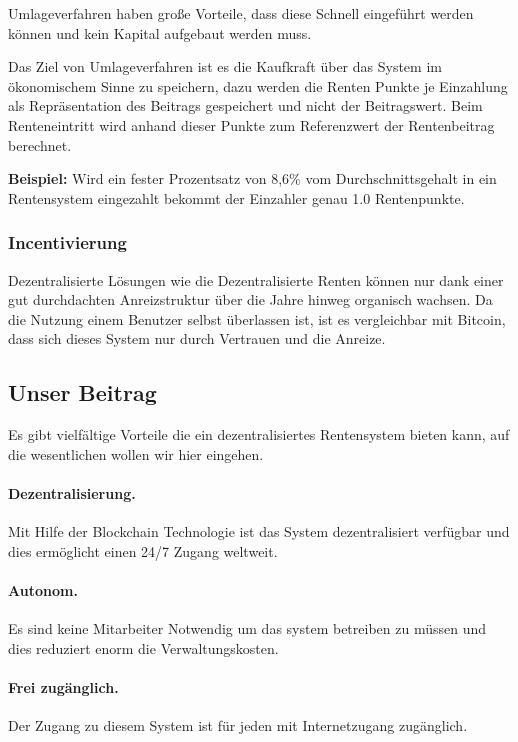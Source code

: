 Umlageverfahren haben große Vorteile, dass diese Schnell eingeführt werden können und kein Kapital aufgebaut werden muss.

Das Ziel von Umlageverfahren ist es die Kaufkraft über das System im ökonomischem Sinne zu speichern, dazu werden die Renten Punkte je Einzahlung als Repräsentation des Beitrags gespeichert und nicht der Beitragswert.
Beim Renteneintritt wird anhand dieser Punkte zum Referenzwert der Rentenbeitrag berechnet. 

\textbf{Beispiel:} Wird ein fester Prozentsatz von 8,6\% vom Durchschnittsgehalt in ein Rentensystem eingezahlt bekommt der Einzahler genau 1.0 Rentenpunkte.


\subsubsection{Incentivierung}


Dezentralisierte Lösungen wie die Dezentralisierte Renten können nur dank einer gut durchdachten Anreizstruktur über die Jahre hinweg organisch wachsen. Da die Nutzung einem Benutzer selbst überlassen ist, ist es vergleichbar mit Bitcoin\cite{nakamoto2012bitcoin}, dass sich dieses System nur durch Vertrauen und die Anreize.


\subsection{Unser Beitrag}
Es gibt vielfältige Vorteile die ein dezentralisiertes Rentensystem bieten kann, auf die wesentlichen wollen wir hier eingehen.

\paragraph{Dezentralisierung.} Mit Hilfe der Blockchain Technologie ist das System dezentralisiert verfügbar und dies ermöglicht einen 24/7 Zugang weltweit.

\paragraph{Autonom.} Es sind keine Mitarbeiter Notwendig um das system betreiben zu müssen und dies reduziert enorm die Verwaltungskosten.

\paragraph{Frei zugänglich.} Der Zugang zu diesem System ist für jeden mit Internetzugang zugänglich.

